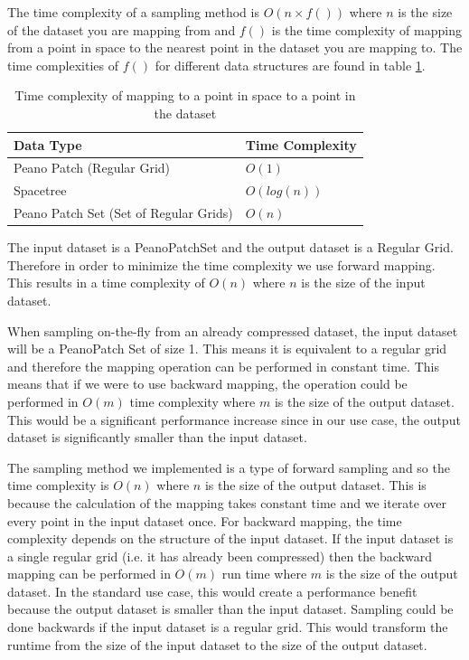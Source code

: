 \documentclass[12pt,a4paper]{article}
\begin{document}
The time complexity of a sampling method is $O(n \times f())$ where $n$ is the size of the dataset you are mapping from and $f()$ is the time complexity of mapping from a point in space to the nearest point in the dataset you are mapping to. The time complexities of $f()$ for different data structures are found in table \ref{time-complexities}.

\begin{table}[h]
\centering
\begin{tabular}{|l|l|}
\hline
\textbf{Data Type}                            & \textbf{Time Complexity} \\ \hline
Peano Patch (Regular Grid)             & $O(1)$            \\ \hline
Spacetree                              & $O(log(n))$       \\ \hline
Peano Patch Set (Set of Regular Grids) & $O(n)$            \\ \hline
\end{tabular}
\caption{Time complexity of mapping to a point in space to a point in the dataset}
\label{time-complexities}
\end{table}

The input dataset is a PeanoPatchSet and the output dataset is a Regular Grid. Therefore in order to minimize the time complexity we use forward mapping. This results in a time complexity of $O(n)$ where $n$ is the size of the input dataset.

When sampling on-the-fly from an already compressed dataset, the input dataset will be a PeanoPatch Set of size 1. This means it is equivalent to a regular grid and therefore the mapping operation can be performed in constant time. This means that if we were to use backward mapping, the operation could be performed in $O(m)$ time complexity where $m$ is the size of the output dataset. This would be a significant performance increase since in our use case, the output dataset is significantly smaller than the input dataset.


The sampling method we implemented is a type of forward sampling and so the time complexity is $O(n)$ where $n$ is the size of the output dataset. This is because the calculation of the mapping takes constant time and we iterate over every point in the input dataset once. For backward mapping, the time complexity depends on the structure of the input dataset. If the input dataset is a single regular grid (i.e. it has already been compressed) then the backward mapping can be performed in $O(m)$ run time where $m$ is the size of the output dataset. In the standard use case, this would create a performance benefit because the output dataset is smaller than the input dataset.
Sampling could be done backwards if the input dataset is a regular grid. This would transform the runtime from the size of the input dataset to the size of the output dataset.
\end{document}
